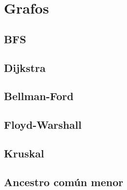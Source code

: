 \section{Grafos}

\subsection{BFS}

\subsection{Dijkstra}

\subsection{Bellman-Ford}

\subsection{Floyd-Warshall}

\subsection{Kruskal}

\subsection{Ancestro común menor}
